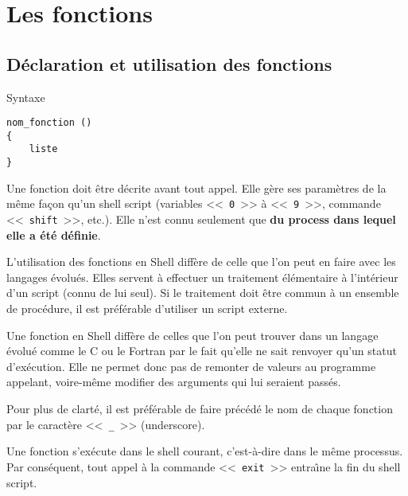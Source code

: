 \section{\label{sh-functions}Les fonctions}

\subsection{D{\'e}claration et utilisation des fonctions}

\begin{definition}{Syntaxe}
\begin{verbatim}
nom_fonction ()
{
    liste
}
\end{verbatim}
\end{definition}

Une fonction doit {\^e}tre d{\'e}crite avant tout appel. Elle g{\`e}re ses param{\`e}tres de la m{\^e}me fa\c{c}on qu'un
shell script (variables <<~\texttt{0}~>> {\`a} <<~\texttt{9}~>>, commande <<~\texttt{shift}~>>, etc.).
Elle n{'}est connu seulement que {\bf du process dans lequel elle a {\'e}t{\'e} d{\'e}finie}.

L{'}utilisation des fonctions en Shell diff{\`e}re de celle que l{'}on peut en faire avec les langages {\'e}volu{\'e}s.
Elles servent {\`a} effectuer un traitement {\'e}l{\'e}mentaire {\`a} l{'}int{\'e}rieur d{'}un script (connu de lui seul). Si le
traitement doit {\^e}tre commun {\`a} un ensemble de proc{\'e}dure, il est pr{\'e}f{\'e}rable d{'}utiliser un script
externe.

Une fonction en Shell diff{\`e}re de celles que l'on peut trouver dans un langage {\'e}volu{\'e} comme
le C ou le Fortran par le fait qu'elle ne sait renvoyer qu'un statut d'ex{\'e}cution. Elle
ne permet donc  pas de remonter de valeurs au programme appelant, voire-m{\^e}me
modifier des arguments qui lui seraient pass{\'e}s.

\begin{remarque}
Pour plus de clart{\'e}, il est pr{\'e}f{\'e}rable de faire pr{\'e}c{\'e}d{\'e} le nom de chaque fonction par le
caract{\`e}re <<~\texttt{\_}~>> (underscore).
\end{remarque}

Une fonction s'ex{\'e}cute dans le shell courant,  c{'}est-{\`a}-dire dans le m{\^e}me processus. Par
cons{\'e}quent, tout appel {\`a} la commande <<~\texttt{exit}~>> entra{\^\i}ne la fin du shell script.

